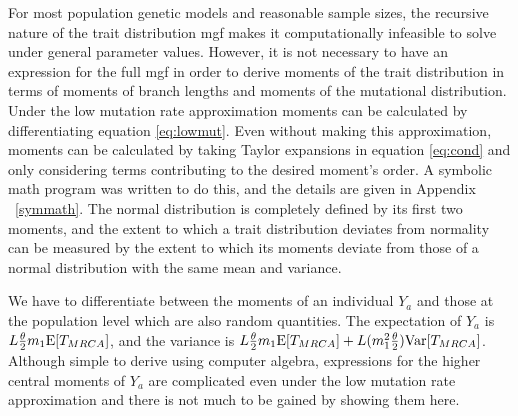 \newcommand{\AAA}{\E[\mathbbm{T}_{4,4}] + \frac{1}{3}\E[\mathbbm{T}_{3,4}] + \frac{2}{9}\E[\mathbbm{T}_{2,4}]}
\newcommand{\BBB}{\frac{1}{9}\E[\mathbbm{T}_{2,4}] + \frac{1}{6}\E[\mathbbm{T}_{3,4}]}
\newcommand{\CCC}{\E[\mathbbm{T}_{4,4}] - \frac{1}{6}\E[\mathbbm{T}_{3,4}] - \frac{1}{9}\E[\mathbbm{T}_{2,4}]}

For most population genetic models and reasonable sample sizes, the recursive
nature of the trait distribution mgf makes it computationally infeasible to
solve under general parameter values. However, it is not necessary to have an
expression for the full mgf in order to derive moments of the trait distribution
in terms of moments of branch lengths and moments of the mutational
distribution. Under the low mutation rate approximation moments can be
calculated by differentiating equation \eqref{eq:lowmut}. Even without making
this approximation, moments can be calculated by taking Taylor expansions in
equation \eqref{eq:cond} and only considering terms contributing to the desired
moment's order. A symbolic math program was written to do this, and the details
are given in Appendix ~\ref{symmath}. The normal distribution is completely
defined by its first two moments, and the extent to which a trait distribution
deviates from normality can be measured by the extent to which its moments
deviate from those of a normal distribution with the same mean and variance.

We have to differentiate between the moments of an individual $Y_a$ and those at
the population level which are also random quantities. The expectation of $Y_a$
is $L \frac{\theta}{2} m_1 \mathrm{E}[T_{MRCA}]$, and the variance is $L \frac{\theta}{2} m_1 \mathrm{E}[T_{MRCA}] +
L(m_1^2\frac{\theta}{2})\mathrm{Var}[T_{MRCA}]$. Although simple to derive using computer algebra,
expressions for the higher central moments of $Y_a$ are complicated even under
the low mutation rate approximation and there is not much to be gained by
showing them here.

